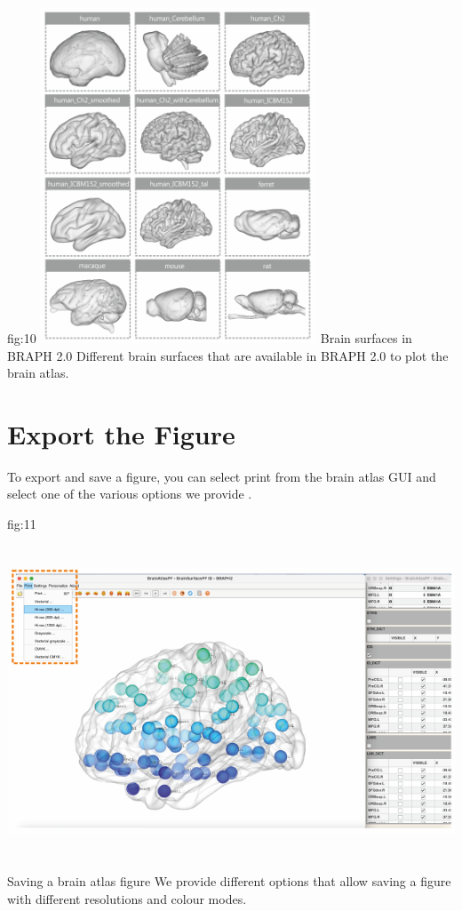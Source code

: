 \documentclass[justified]{tufte-handout}
\begin{document}
	{fig:10}
	{\includegraphics[height=10cm]{tut_ba/fig10.png}}
	{Brain surfaces in BRAPH 2.0}
	{
	Different brain surfaces that are available in BRAPH 2.0 to plot the brain atlas.
	}

\clearpage
\section{Export the Figure}

To export and save a figure, you can select print from the brain atlas GUI and select one of the various options we provide .

	{fig:11}
	{\includegraphics[height=10cm]{tut_ba/fig11.png}}
	{Saving a brain atlas figure}
	{
	We provide different options that allow saving a figure with different resolutions and colour modes. 
	}
\end{document}
